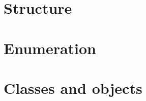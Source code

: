 \section{Structure}%
\label{sec:structs}


\section{Enumeration}%
\label{sec:enum}


\section{Classes and objects}%
\label{sec:classes}

